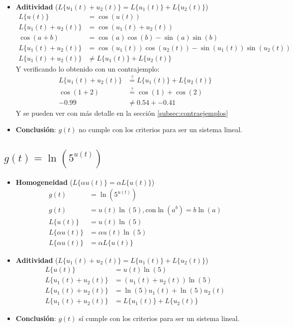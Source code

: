 \documentclass[12pt,a4paper]{article}
\begin{document}
\begin{itemize}
    \item \textbf{Aditividad} ($L\{u_1(t)+u_2(t)\}=L\{u_1(t)\}+ L\{u_2(t)\}$)
    \begin{align*}
        L\{u(t)\} &= \cos(u(t))\\
        L\{u_1(t)+u_2(t)\} &= \cos (u_1(t)+u_2(t))\\
        \cos(a+b) &= \cos(a)\cos(b)-\sin(a)\sin(b)\\
        L\{u_1(t)+u_2(t)\} &= \cos(u_1(t))\cos(u_2(t))-\sin(u_1(t))\sin(u_2(t))\\
        L\{u_1(t)+u_2(t)\} &\neq L\{u_1(t)\}+L\{u_2(t)\} 
    \end{align*}
    Y verificando lo obtenido con un contrajemplo:
    \begin{align*}
        L\{u_1(t)+u_2(t)\} &\stackrel{?}{=} L\{u_1(t)\}+ L\{u_2(t)\}\\
        \cos(1+2) &\stackrel{?}{=} \cos(1) + \cos(2)\\
         -0.99 &\neq 0.54 + -0.41
    \end{align*}
    Y se pueden ver con más detalle en la sección \ref{subsec:contraejemplos}
    \item \textbf{Conclusión}: $g(t)$ no cumple con los criterios para ser un sistema lineal.
\end{itemize}

\subsection{$g(t)=\ln(5^{u(t)})$}

\begin{itemize}
    \item \textbf{Homogeneidad} ($L\{\alpha u(t)\} = \alpha L\{u(t)\}$)
    \begin{align*}
        g(t)&=\ln(5^{u(t)})\\
        g(t) &= u(t)\ln(5), \text{con} \ln(a^b)=b\ln(a)\\
        L\{u(t)\} &= u(t)\ln(5)\\
        L\{\alpha u(t)\} &= \alpha u(t) \ln(5)\\
        L\{\alpha u(t)\} &= \alpha L\{u(t)\}
    \end{align*}
    \item \textbf{Aditividad} ($L\{u_1(t)+u_2(t)\}=L\{u_1(t)\}+ L\{u_2(t)\}$)
        \begin{align*}
        L\{u(t)\} &= u(t)\ln(5)\\
        L\{u_1(t)+u_2(t)\} &= (u_1(t)+u_2(t)) \ln(5)\\
        L\{u_1(t)+u_2(t)\} &= \ln(5)u_1(t)+\ln(5)u_2(t)\\
        L\{u_1(t)+u_2(t)\} &= L\{u_1(t)\}+L\{u_2(t)\}
    \end{align*}
    \item \textbf{Conclusión}: $g(t)$ sí cumple con los criterios para ser un sistema lineal.
\end{itemize}
\end{document}
